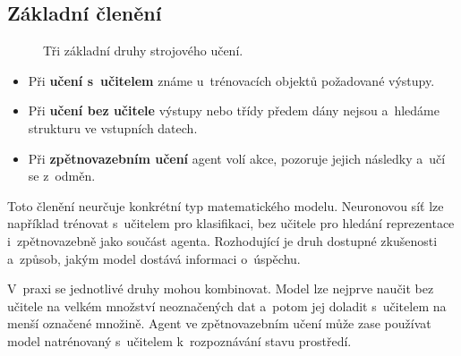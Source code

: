 \subsection{Základní členění}

\begin{figure}[ht]
    \centering
    
    \caption{Tři základní druhy strojového učení.}
    \label{fig:ai-druhy-uceni}
\end{figure}

\begin{itemize}
    \item Při \textbf{učení s~učitelem} známe u~trénovacích objektů požadované výstupy.
    \item Při \textbf{učení bez učitele} výstupy nebo třídy předem dány nejsou a~hledáme strukturu ve vstupních datech.
    \item Při \textbf{zpětnovazebním učení} agent volí akce, pozoruje jejich následky a~učí se z~odměn.
\end{itemize}

Toto členění neurčuje konkrétní typ matematického modelu. Neuronovou síť lze například trénovat s~učitelem pro klasifikaci, bez učitele pro hledání reprezentace i~zpětnovazebně jako součást agenta. Rozhodující je druh dostupné zkušenosti a~způsob, jakým model dostává informaci o~úspěchu.

V~praxi se jednotlivé druhy mohou kombinovat. Model lze nejprve naučit bez učitele na velkém množství neoznačených dat a~potom jej doladit s~učitelem na menší označené množině. Agent ve zpětnovazebním učení může zase používat model natrénovaný s~učitelem k~rozpoznávání stavu prostředí.

